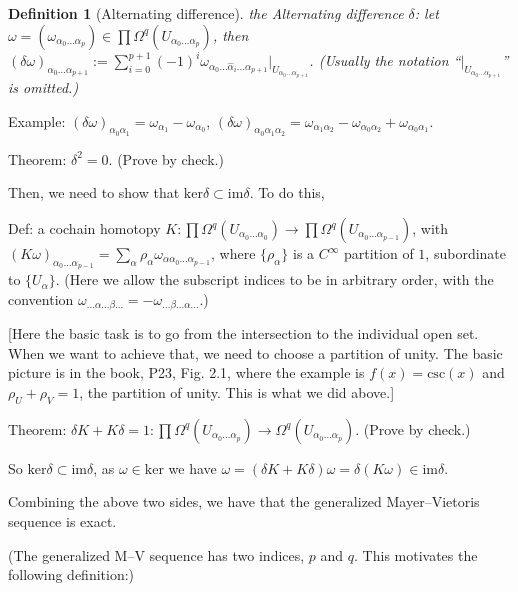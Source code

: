 \documentclass{article}
\theoremstyle{mystyle}
\newtheorem*{definition}{Definition}%
\theoremstyle{remark}
\numberwithin{equation}{section}
\begin{document}
\begin{definition}[Alternating difference] the \emph{Alternating difference} $\delta$: let $\omega = (\omega_{\alpha_0...\alpha_p})\in \prod \Omega^q(U_{\alpha_0...\alpha_p})$, then $(\delta\omega)_{\alpha_0...\alpha_{p+1}} :=
\sum_{i=0}^{p+1} (-1)^i\omega_{\alpha_0...\hat{\alpha}_i...\alpha_{p+1}}|_{U_{\alpha_0...\alpha_{p+1}}}$. (Usually the notation ``$|_{U_{\alpha_0...\alpha_{p+1}}}$'' is omitted.)
\end{definition}

Example: $(\delta\omega)_{\alpha_0\alpha_1} = \omega_{\alpha_1}-\omega_{\alpha_0}$, $(\delta\omega)_{\alpha_0\alpha_1\alpha_2} = \omega_{\alpha_1\alpha_2}-\omega_{\alpha_0\alpha_2}+\omega_{\alpha_0\alpha_1}$. 

Theorem: $\delta^2 = 0$. (Prove by check.)

Then, we need to show that $\mathrm{ker}\delta \subset \mathrm{im}\delta$. To do this,

Def: a cochain homotopy $K\colon \prod\Omega^q(U_{\alpha_0...\alpha_0})
\rightarrow
\prod\Omega^q(U_{\alpha_0...\alpha_{p-1}})$, with
$(K\omega)_{\alpha_0...\alpha_{p-1}}
=
\sum_\alpha \rho_\alpha \omega_{\alpha\alpha_0...\alpha_{p-1}}$, where $\{\rho_\alpha\}$ is a $C^\infty$ partition of $1$, subordinate to $\{U_\alpha\}$. (Here we allow the subscript indices to be in arbitrary order, with the convention $\omega_{...\alpha...\beta...} = -\omega_{...\beta...\alpha...}$.)
 
 [Here the basic task is to go from the intersection to the individual open set. When we want to achieve that, we need to choose a partition of unity. The basic picture is in the book, P23, Fig. 2.1, where the example is $f(x) = \mathrm{csc}(x)$ and $\rho_U+\rho_V = 1$, the partition of unity. This is what we did above.]
 
 Theorem: $\delta K + K\delta = 1\colon
 \prod\Omega^q(U_{\alpha_0...\alpha_p})
 \rightarrow \Omega^q(U_{\alpha_0...\alpha_p})$. (Prove by check.)
 
So $\mathrm{ker}\delta\subset \mathrm{im}\delta$, as $\omega \in \mathrm{ker}$ we have $\omega = (\delta K+K\delta)\omega = \delta (K\omega) \in \mathrm{im}\delta$. 

Combining the above two sides, we have that the generalized Mayer--Vietoris sequence is exact.

(The generalized M--V sequence has two indices, $p$ and $q$. This motivates the following definition:)
\end{document}

